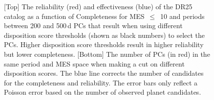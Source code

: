 \begin{figure}[htb]
\begin{center}
\begin{tabular}{c}
  \end{tabular}
  \caption{\label{f:adjscore}[Top] The reliability (red) and effectiveness (blue) of the DR25 catalog as a function of Completeness for MES~$\leq$~10 and periods between 200 and 500\,d PCs that result when using different disposition score thresholds (shown as black numbers) to select the PCs. Higher disposition score thresholds result in higher reliability but lower completeness. [Bottom] The number of PCs (in red) in the same period and MES space when making a cut on different disposition scores.  The blue line corrects the number of candidates for the completeness and reliability. The error bars only reflect a Poisson error based on the number of observed planet candidates.}
 \end{center}
 \end{figure}


